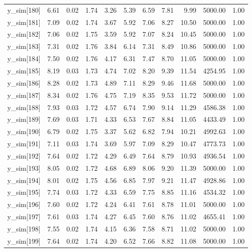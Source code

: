 \begin{table}[ht]
\begin{tabular}{rrrrrrrrrrr}
  y\_sim[180] & 6.61 & 0.02 & 1.74 & 3.26 & 5.39 & 6.59 & 7.81 & 9.99 & 5000.00 & 1.00 \\ 
  y\_sim[181] & 7.09 & 0.02 & 1.74 & 3.67 & 5.92 & 7.06 & 8.27 & 10.50 & 5000.00 & 1.00 \\ 
  y\_sim[182] & 7.06 & 0.02 & 1.75 & 3.59 & 5.92 & 7.07 & 8.24 & 10.45 & 5000.00 & 1.00 \\ 
  y\_sim[183] & 7.31 & 0.02 & 1.76 & 3.84 & 6.14 & 7.31 & 8.49 & 10.86 & 5000.00 & 1.00 \\ 
  y\_sim[184] & 7.50 & 0.02 & 1.76 & 4.17 & 6.31 & 7.47 & 8.70 & 11.05 & 5000.00 & 1.00 \\ 
  y\_sim[185] & 8.19 & 0.03 & 1.73 & 4.74 & 7.02 & 8.20 & 9.39 & 11.54 & 4254.95 & 1.00 \\ 
  y\_sim[186] & 8.28 & 0.02 & 1.73 & 4.89 & 7.11 & 8.29 & 9.46 & 11.68 & 5000.00 & 1.00 \\ 
  y\_sim[187] & 8.34 & 0.02 & 1.76 & 4.75 & 7.19 & 8.35 & 9.53 & 11.72 & 5000.00 & 1.00 \\ 
  y\_sim[188] & 7.93 & 0.03 & 1.72 & 4.57 & 6.74 & 7.90 & 9.14 & 11.29 & 4586.38 & 1.00 \\ 
  y\_sim[189] & 7.69 & 0.03 & 1.71 & 4.33 & 6.53 & 7.67 & 8.84 & 11.05 & 4433.49 & 1.00 \\ 
  y\_sim[190] & 6.79 & 0.02 & 1.75 & 3.37 & 5.62 & 6.82 & 7.94 & 10.21 & 4992.63 & 1.00 \\ 
  y\_sim[191] & 7.11 & 0.03 & 1.74 & 3.69 & 5.97 & 7.09 & 8.29 & 10.47 & 4773.73 & 1.00 \\ 
  y\_sim[192] & 7.64 & 0.02 & 1.72 & 4.29 & 6.49 & 7.64 & 8.79 & 10.93 & 4936.54 & 1.00 \\ 
  y\_sim[193] & 8.05 & 0.02 & 1.72 & 4.68 & 6.89 & 8.06 & 9.20 & 11.39 & 5000.00 & 1.00 \\ 
  y\_sim[194] & 8.01 & 0.02 & 1.75 & 4.56 & 6.85 & 7.97 & 9.21 & 11.47 & 4928.86 & 1.00 \\ 
  y\_sim[195] & 7.74 & 0.03 & 1.72 & 4.33 & 6.59 & 7.75 & 8.85 & 11.16 & 4534.32 & 1.00 \\ 
  y\_sim[196] & 7.60 & 0.02 & 1.72 & 4.24 & 6.41 & 7.61 & 8.78 & 11.01 & 5000.00 & 1.00 \\ 
  y\_sim[197] & 7.61 & 0.03 & 1.74 & 4.27 & 6.45 & 7.60 & 8.76 & 11.02 & 4655.41 & 1.00 \\ 
  y\_sim[198] & 7.55 & 0.02 & 1.74 & 4.15 & 6.36 & 7.58 & 8.71 & 11.02 & 5000.00 & 1.00 \\ 
  y\_sim[199] & 7.64 & 0.02 & 1.74 & 4.20 & 6.52 & 7.66 & 8.82 & 11.08 & 5000.00 & 1.00 \\ 

\end{tabular}
\end{table}
